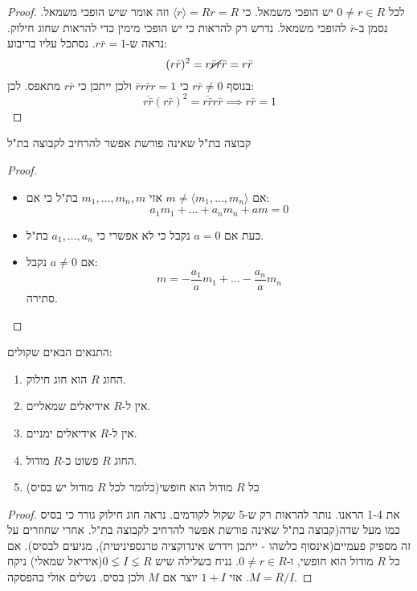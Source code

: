 \documentclass{tstextbook}
\begin{document}
\begin{proof}
לכל \(0\neq r \in R\) יש הופכי משמאל. כי \(\langle r \rangle=Rr=R\) וזה אומר שיש הופכי משמאל. נסמן ב-\(\bar{r}\) להופכי משמאל. נדרש רק להראות כי יש הופכי מימין כדי להראות שחוג חילוק. נראה ש-\(r\bar{r}=1\). נסתכל עליו בריבוע:
$$(r\bar{r})^{2}=r\cancel{ \bar{r}r }\bar{r}=r\bar{r}$$
בנוסף \(r\bar{r}\neq 0\) כי \(\bar{r}r\bar{r}r=1\) ולכן ייתכן כי \(r\bar{r}\) מתאפס.
לכן:
$$\overline{r\bar{r}} (r\bar{r})^{2}=\overline{r\bar{r}} r\bar{r}\implies r\bar{r}=1$$

\end{proof}
\begin{lemma}
קבוצה בת"ל שאינה פורשת אפשר להרחיב לקבוצה בת"ל

\end{lemma}
\begin{proof}
  \begin{itemize}
    \item אם \(m\neq \langle m_{1},\dots,m_{n} \rangle\) אזי \(m_{1},\dots,m_{n},m\) בת"ל כי אם:
$$a_{1}m_{1}+\dots+a_{n}m_{n}+am=0$$
    \item כעת אם \(a=0\) נקבל כי לא אפשרי כי \(a_{1},\dots,a_{n}\) בת"ל.
    \item אם \(a\neq 0\) נקבל:
$$m=-\frac{a_{1}}{a}m_{1}+\dots-\frac{a_{n}}{a}m_{n}$$
סתירה.
  \end{itemize}
\end{proof}
\begin{proposition}
התנאים הבאים שקולים:

  \begin{enumerate}
    \item החוג \(R\) הוא חוג חילוק. 


    \item אין ל-\(R\) אידיאלים שמאליים. 


    \item אין ל-\(R\) אידיאלים ימניים. 


    \item החוג \(R\) פשוט כ-\(R\) מודול. 


    \item כל \(R\) מודול הוא חופשי(כלומר לכל \(R\) מודול יש בסיס) 


  \end{enumerate}
\end{proposition}
\begin{proof}
את 1-4 הראנו. נותר להראות רק ש-5 שקול לקודמים.
נראה חוג חילוק גורר כי בסיס כמו מעל שדה(קבוצה בת"ל שאינה פורשת אפשר להרחיב לקבוצה בת"ל.
אחרי שחוזרים על זה מספיק פעמיים(אינסוף כלשהו - ייתכן וידרש אינדוקציה טרנספיניטית), מגיעים לבסיס).
אם כל \(R\) מודול הוא חופשי, ו-\(0 \neq r\in R\). 
נניח בשלילה שיש \(0\lneq I\lneq R\)(אידיאל שמאלי) ניקח \(M= R / I\). אזי \(1+I\) יוצר אם \(M\) ולכן בסיס. נשלים אולי בהפסקה.

\end{proof}
\end{document}
